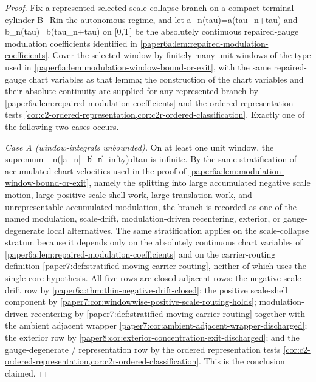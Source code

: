 \documentclass[11pt]{amsart}
\def\({}%
\def\){}%
\def\tau{tau}%
\def\infty{infty}%
\theoremstyle{plain}
\theoremstyle{definition}
\theoremstyle{remark}
\begin{document}
\begin{proof}
Fix a represented selected scale-collapse branch on a compact terminal
cylinder \(B_R\times[\tau_n,\tau_n+T]\) in the autonomous regime, and let
\(a_n(\tau)=a(\tau_n+\tau)\) and \(b_n(\tau)=b(\tau_n+\tau)\) on
\([0,T]\) be the absolutely continuous repaired-gauge modulation
coefficients identified in
\cref{paper6a:lem:repaired-modulation-coefficients}.  Cover the selected
window by finitely many unit windows of the type used in
\cref{paper6a:lem:modulation-window-bound-or-exit}, with the same
repaired-gauge chart variables as that lemma; the construction of the
chart variables and their absolute continuity are supplied for any
represented branch by
\cref{paper6a:lem:repaired-modulation-coefficients} and the ordered
representation tests
\cref{cor:c2-ordered-representation,cor:c2r-ordered-classification}.
Exactly one of the following two cases occurs.

\smallskip\noindent\emph{Case A (window-integrals unbounded).}  On at least
one unit window, the supremum
\(\sup_n\int(|a_n|+\|b_n\|_\infty)\,d\tau\) is infinite.  By the same
stratification of accumulated chart velocities used in the proof of
\cref{paper6a:lem:modulation-window-bound-or-exit}, namely the splitting
into large accumulated negative scale motion, large positive scale-shell
work, large translation work, and unrepresentable accumulated modulation,
the branch is recorded as one of the named modulation, scale-drift,
modulation-driven recentering, exterior, or gauge-degenerate local
alternatives.  The same stratification applies on the scale-collapse
stratum because it depends only on the absolutely continuous chart
variables of
\cref{paper6a:lem:repaired-modulation-coefficients} and on the
carrier-routing definition
\cref{paper7:def:stratified-moving-carrier-routing}, neither of which uses
the single-core hypothesis.  All five rows are closed
adjacent rows: the negative scale-drift row by
\cref{paper6a:thm:thin-negative-drift-closed}; the positive scale-shell
component by
\cref{paper7:cor:windowwise-positive-scale-routing-holds}; modulation-driven
recentering by
\cref{paper7:def:stratified-moving-carrier-routing} together with the
ambient adjacent wrapper
\cref{paper7:cor:ambient-adjacent-wrapper-discharged}; the exterior row by
\cref{paper8:cor:exterior-concentration-exit-discharged}; and the
gauge-degenerate / representation row by the ordered representation tests
\cref{cor:c2-ordered-representation,cor:c2r-ordered-classification}.  This
is the conclusion claimed.


\end{proof}
\end{document}
